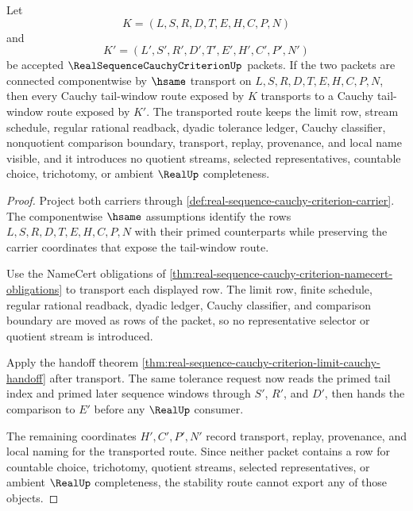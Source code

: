\begin{theorem}
\label{thm:real-sequence-cauchy-criterion-tail-stability}
Let
$$
K=(L,S,R,D,T,E,H,C,P,N)
$$
and
$$
K'=(L',S',R',D',T',E',H',C',P',N')
$$
be accepted $\RealSequenceCauchyCriterionUp$ packets. If the two packets are connected componentwise by $\hsame$ transport on $L,S,R,D,T,E,H,C,P,N$, then every Cauchy tail-window route exposed by $K$ transports to a Cauchy tail-window route exposed by $K'$. The transported route keeps the limit row, stream schedule, regular rational readback, dyadic tolerance ledger, Cauchy classifier, nonquotient comparison boundary, transport, replay, provenance, and local name visible, and it introduces no quotient streams, selected representatives, countable choice, trichotomy, or ambient $\RealUp$ completeness.
\end{theorem}
\begin{proof}
Project both carriers through \autoref{def:real-sequence-cauchy-criterion-carrier}. The componentwise $\hsame$ assumptions identify the rows $L,S,R,D,T,E,H,C,P,N$ with their primed counterparts while preserving the carrier coordinates that expose the tail-window route.

Use the NameCert obligations of \autoref{thm:real-sequence-cauchy-criterion-namecert-obligations} to transport each displayed row. The limit row, finite schedule, regular rational readback, dyadic ledger, Cauchy classifier, and comparison boundary are moved as rows of the packet, so no representative selector or quotient stream is introduced.

Apply the handoff theorem \autoref{thm:real-sequence-cauchy-criterion-limit-cauchy-handoff} after transport. The same tolerance request now reads the primed tail index and primed later sequence windows through $S'$, $R'$, and $D'$, then hands the comparison to $E'$ before any $\RealUp$ consumer.

The remaining coordinates $H',C',P',N'$ record transport, replay, provenance, and local naming for the transported route. Since neither packet contains a row for countable choice, trichotomy, quotient streams, selected representatives, or ambient $\RealUp$ completeness, the stability route cannot export any of those objects.
\end{proof}


